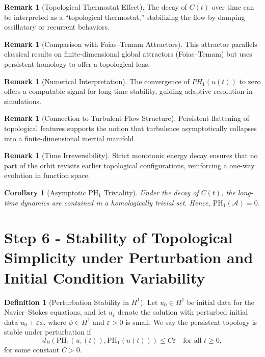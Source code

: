 \documentclass[11pt]{article}
\newtheorem{corollary}[theorem]{Corollary}
\theoremstyle{definition}
\newtheorem{definition}[theorem]{Definition}
\newtheorem{remark}[theorem]{Remark}
\begin{document}
\begin{remark}[Topological Thermostat Effect]
The decay of $C(t)$ over time can be interpreted as a “topological thermostat,” stabilizing the flow by damping oscillatory or recurrent behaviors.
\end{remark}

\begin{remark}[Comparison with Foias--Temam Attractors]
This attractor parallels classical results on finite-dimensional global attractors (Foias--Temam) but uses persistent homology to offer a topological lens.
\end{remark}

\begin{remark}[Numerical Interpretation]
The convergence of $PH_1(u(t))$ to zero offers a computable signal for long-time stability, guiding adaptive resolution in simulations.
\end{remark}

\begin{remark}[Connection to Turbulent Flow Structure]
Persistent flattening of topological features supports the notion that turbulence asymptotically collapses into a finite-dimensional inertial manifold.
\end{remark}

\begin{remark}[Time Irreversibility]
Strict monotonic energy decay ensures that no part of the orbit revisits earlier topological configurations, reinforcing a one-way evolution in function space.
\end{remark}

\begin{corollary}[Asymptotic PH$_1$ Triviality]
Under the decay of $C(t)$, the long-time dynamics are contained in a homologically trivial set. Hence, $\mathrm{PH}_1(\mathcal{A}) = 0$.
\end{corollary}


\section{Step 6 - Stability of Topological Simplicity under Perturbation and Initial Condition Variability}
\label{sec:step6}

\begin{definition}[Perturbation Stability in $H^1$]
Let $u_0 \in H^1$ be initial data for the Navier--Stokes equations, and let $u_\varepsilon$ denote the solution with perturbed initial data $u_0 + \varepsilon \phi$, where $\phi \in H^1$ and $\varepsilon > 0$ is small. We say the persistent topology is stable under perturbation if
\[
d_B(\mathrm{PH}_1(u_\varepsilon(t)), \mathrm{PH}_1(u(t))) \leq C\varepsilon \quad \text{for all } t \ge 0,
\]
for some constant $C > 0$.
\end{definition}
\end{document}
